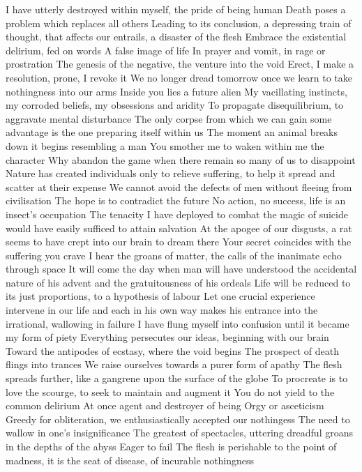 \documentclass{article}
\begin{document}
I have utterly destroyed within myself, the pride of being human
Death poses a problem which replaces all others
Leading to its conclusion, a depressing train of thought, that affects our entrails, a disaster of the flesh
Embrace the existential delirium, fed on words
A false image of life
In prayer and vomit, in rage or prostration
The genesis of the negative, the venture into the void
Erect, I make a resolution, prone, I revoke it
We no longer dread tomorrow once we learn to take nothingness into our arms
Inside you lies a future alien
My vacillating instincts, my corroded beliefs, my obsessions and aridity
To propagate disequilibrium, to aggravate mental disturbance
The only corpse from which we can gain some advantage is the one preparing itself within us
The moment an animal breaks down it begins resembling a man
You smother me to waken within me the character
Why abandon the game when there remain so many of us to disappoint
Nature has created individuals only to relieve suffering, to help it spread and scatter at their expense
We cannot avoid the defects of men without fleeing from civilisation
The hope is to contradict the future
No action, no success, life is an insect's occupation
The tenacity I have deployed to combat the magic of suicide would have easily sufficed to attain salvation
At the apogee of our disgusts, a rat seems to have crept into our brain to dream there
Your secret coincides with the suffering you crave
I hear the groans of matter, the calls of the inanimate echo through space
It will come the day when man will have understood the accidental nature of his advent and the gratuitousness of his ordeals
Life will be reduced to its just proportions, to a hypothesis of labour
Let one crucial experience intervene in our life and each in his own way makes his entrance into the irrational, wallowing in failure
I have flung myself into confusion until it became my form of piety
Everything persecutes our ideas, beginning with our brain
Toward the antipodes of ecstasy, where the void begins
The prospect of death flings into trances
We raise ourselves towards a purer form of apathy
The flesh spreads further, like a gangrene upon the surface of the globe
To procreate is to love the scourge, to seek to maintain and augment it
You do not yield to the common delirium
At once agent and destroyer of being
Orgy or asceticism
Greedy for obliteration, we enthusiastically accepted our nothingess
The need to wallow in one's insignificance
The greatest of spectacles, uttering dreadful groans in the depths of the abyss
Eager to fail
The flesh is perishable to the point of madness, it is the seat of disease, of incurable nothingness
\end{document}
